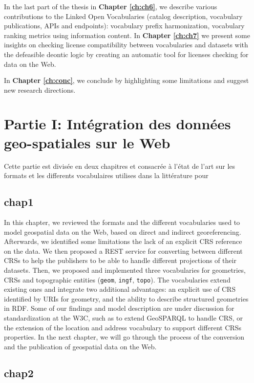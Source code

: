 \documentclass[a4paper,11pt,twoside]{report}
\begin{document}
 In the last part of the thesis in \textbf{Chapter \ref{ch:ch6}}, we describe various contributions to the Linked Open Vocabularies (catalog description, vocabulary publications, APIs and endpoints): vocabulary prefix harmonization, vocabulary ranking metrics using information content. 
  In \textbf{Chapter \ref{ch:ch7}} we present some insights on checking license compatibility between vocabularies and datasets with the defeasible deontic logic by creating an automatic tool for licenses checking for data on the Web. 


 In \textbf{Chapter \ref{ch:conc}}, we conclude by highlighting some limitations and suggest new research directions.


\chapter*{Partie I: Intégration des données geo-spatiales sur le Web}

Cette partie est divisée en deux chapitres et consacrée à l'état de l'art sur les formats et les differents vocabulaires utilises dans la littérature pour  

\section*{chap1}

In this chapter, we reviewed the formats and the different vocabularies used to model geospatial data on the Web, based on direct and indirect georeferencing. Afterwards, we identified some limitations the lack of an explicit CRS reference on the data. We then proposed a REST service for converting between different CRSs to help the publishers to be able to handle different projections of their datasets. Then, we proposed and implemented three vocabularies for geometries, CRSs and topographic entities (\texttt{geom}, \texttt{ingf}, \texttt{topo}). The vocabularies extend existing ones and integrate two additional advantages: an explicit use of CRS identified by URIs for geometry, and the ability to describe structured geometries in RDF. Some of our findings and model description are under discussion for standardization at the W3C, such as to extend GeoSPARQL to handle CRS, or the extension of the location and address vocabulary \cite{locnvocab} to support different CRSs properties.
In the next chapter, we will go through the process of the conversion and the publication of geospatial data on the Web.

\section*{chap2}
\end{document}
